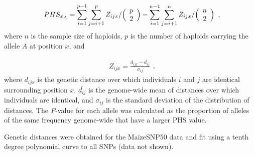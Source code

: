 \begin{equation}
  \label{phs-1}
  \begin{array}{l}
  \displaystyle{
PHS_{x_A} = \sum^{p-1}_{i=1}\sum^{p}_{j=i+1}Z_{ijx}  / \Bigl( \begin{array}{c} p \\ 2 \\ \end{array} \Bigr) 
- \sum^{n-1}_{i=1}\sum^{n}_{j=i+1}Z_{ijx}  / \Bigl( \begin{array}{c} n \\ 2 \\ \end{array} \Bigr) 
  }
  \end {array} 
  \textrm{,}
\end{equation}
\noindent where $n$ is the sample size of haploids, $p$  is the number of haploids carrying the allele $A$ at position $x$, and

\begin{equation}
  \label{phs-2}
  \begin{array}{l}
  \displaystyle{
Z_{ijx} = \frac{ d_{ijx} - \bar{d_{ij}} }{ \sigma_{ij} }
  }
  \end {array} 
  \textrm{,}
\end{equation}
\noindent where $d_{ijx}$ is the genetic distance over which individuals $i$ and $j$ are identical surrounding position $x$, $\bar{d_{ij}}$ is the genome-wide mean of distances over which individuals are identical, and $\sigma_{ij}$ is the standard deviation of the distribution of distances.  
The \emph{P}-value for each allele was calculated as the proportion of alleles of the same frequency genome-wide that have a larger PHS value. 

Genetic distances were obtained for the MaizeSNP50 data \cite[]{Ganal_2011_22174790} and fit using a tenth degree polynomial curve to all SNPs (data not shown).
 
